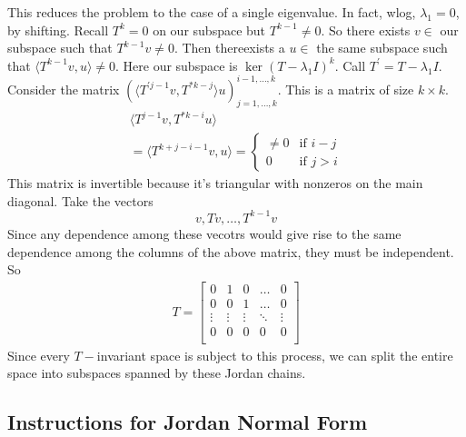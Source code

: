 \documentclass{article}
\begin{document}
This reduces the problem to the case of a single eigenvalue. In fact, wlog, $\lambda_{1} = 0$, by shifting. Recall $T^{k} = 0$ on our subspace but $T^{k - 1} \neq 0$. So there exists $v \in$ our subspace such that $T^{k - 1}v \neq 0$. Then thereexists a $u \in $ the same subspace such that $\langle T^{k - 1}v, u \rangle \neq 0$. Here our subspace is $\ker{(T - \lambda_{1}I)^{k}}$. Call $T^{\prime} = T - \lambda_{1}I$. Consider the matrix $(\langle T^{\prime j - 1}v, T^{* k - j} \rangle u)^{i - 1, \ldots, k}_{j = 1, \ldots, k}$. This is a matrix of  size $k \times k$. 
\begin{align*}
	\langle T^{j - 1}v, T^{* k - i}u \rangle \\
	 = \langle T^{k + j - i - 1}v, u \rangle = 
	 \begin{cases}
		 \neq 0 & \text{if $i - j$} \\
		 0 & \text{if $j > i$}
	 \end{cases}
\end{align*}
This matrix is invertible because it's triangular with nonzeros on the main diagonal. Take the vectors 
\begin{equation*}
	v, Tv, \ldots, T^{k - 1}v
\end{equation*}
Since any dependence among these vecotrs would give rise to the same dependence among the columns of the above matrix, they must be independent. So 
	\begin{align*} 
		T = 
		\begin{bmatrix}
		0      & 1      & 0      & \ldots & 0      \\
		0      & 0      & 1      & \ldots & 0      \\
		\vdots & \vdots & \vdots & \ddots & \vdots \\
		0      & 0      & 0      & 0      & 0      \\
		\end{bmatrix}
	\end{align*}
	Since every $T-$invariant space is subject to this process, we can split the entire space into subspaces spanned by these Jordan chains. 

\begin{topic}
	\section*{Instructions for Jordan Normal Form}
\end{topic}
\end{document}
